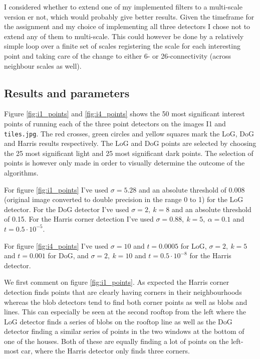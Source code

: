 \documentclass[11pt,a4paper]{article}
\begin{document}
I considered whether to extend one of my implemented filters to a multi-scale
version er not, which would probably give better results. Given the timeframe
for the assignment and my choice of implementing all three detectors I chose
not to extend any of them to multi-scale. This could however be done by a
relatively simple loop over a finite set of scales registering the scale for each
interesting point and taking care of the change to either 6- or 26-connectivity
(across neighbour scales as well).

\subsection{Results and parameters}
Figure \ref{fig:i1_points} and \ref{fig:i4_points} shows the 50 most
significant interest points of running each of the three point detectors on
the images I1 and \texttt{tiles.jpg}. The red crosses, green circles and
yellow squares mark the LoG, DoG and Harris results respectively. The LoG and
DoG points are selected by choosing the 25 most significant light and 25 most
significant dark points. The selection of points is however only made in order
to visually determine the outcome of the algorithms.

For figure \ref{fig:i1_points} I've used $\sigma = 5.28$ and an absolute
threshold of $0.008$ (original image converted to double precision in the
range 0 to 1) for the LoG detector. For the DoG detector I've used $\sigma =
2,~k = 8$ and an absolute threshold of 0.15. For the Harris corner detection
I've used $\sigma = 0.88,~k=5,~\alpha = 0.1$ and $t= 0.5\cdot
10^{-5}$.

For figure \ref{fig:i4_points} I've used $\sigma = 10$ and $t= 0.0005$ for
LoG, $\sigma = 2,~k=5$ and $t = 0.001$ for DoG, and $\sigma = 2,~k=10$ and $t=
0.5\cdot 10^{-8}$ for the Harris detector.

We first comment on figure \ref{fig:i1_points}. As expected the Harris corner
detection finds points that are clearly having corners in their neighbourhoods
whereas the blob detectors tend to find both corner points as well as blobs
and lines. This can especially be seen at the second rooftop from the left
where the LoG detector finds a series of blobs on the rooftop line as well as
the DoG detector finding a similar series of points in the two windows at the
bottom of one of the houses. Both of these are equally finding a lot of points
on the left-most car, where the Harris detector only finds three corners.
\end{document}
